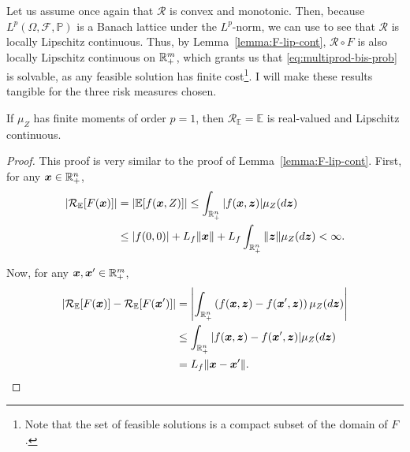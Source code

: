 \documentclass[12pt]{article}
\begin{document}
Let us assume once again that $\mathcal{R}$ is convex and monotonic.
Then, because $L^{p}(\Omega,\mathcal{F},\mathbb{P})$ is a Banach lattice under the $L^{p}$-norm, we can use \citet[Theorem~4.1]{cheriditoRiskMeasuresOrlicz2009} to see that $\mathcal{R}$ is locally Lipschitz continuous.
Thus, by Lemma~\ref{lemma:F-lip-cont}, $\mathcal{R} \circ F$ is also locally Lipschitz continuous on $\mathbb{R}^{m}_{+}$, which grants us that \eqref{eq:multiprod-bis-prob} is solvable, as any feasible solution has finite cost\footnote{Note that the set of feasible solutions is a compact subset of the domain of $F$.}.
I will make these results tangible for the three risk measures chosen.

\begin{lemma}\label{eq:lip-cont-E}
    If $\mu_Z$ has finite moments of order $p=1$, then $\mathcal{R}_{\mathbb{E}} = \mathbb{E}$ is real-valued and Lipschitz continuous.
\end{lemma}
\begin{proof}
    This proof is very similar to the proof of Lemma~\ref{lemma:F-lip-cont}.
    First, for any $\bm{x}\in \mathbb{R}^{n}_+$,
    \begin{align*}
	|\mathcal{R}_{\mathbb{E}}[F(\bm{x})]| &= |\mathbb{E}[f(\bm{x},Z)]| \le \int_{\mathbb{R}^{n}_+} |f(\bm{x},\bm{z})| \mu_Z(d\bm{z}) \\
	&\le |f(0,0)| + L_f \| \bm{x} \| + L_f \int_{\mathbb{R}^{n}_+} \|\bm{z}\| \mu_Z(d\bm{z}) < \infty
    .\end{align*}

    Now, for any $\bm{x},\bm{x}'\in \mathbb{R}^{m}_+$,
    \begin{align*}
	|\mathcal{R}_\mathbb{E}[F(\bm{x})] - \mathcal{R}_\mathbb{E}[F(\bm{x}')]| &= \left| \int_{\mathbb{R}^{n}_+} \left( f(\bm{x},\bm{z}) - f(\bm{x}',\bm{z}) \right) \mu_Z(d\bm{z}) \right|  \\
	&\le \int_{\mathbb{R}^{n}_+} |f(\bm{x},\bm{z}) - f(\bm{x}',\bm{z})| \mu_Z(d\bm{z}) \\
	&= L_f \|\bm{x} - \bm{x}'\|
    .\end{align*}
\end{proof}
\end{document}
